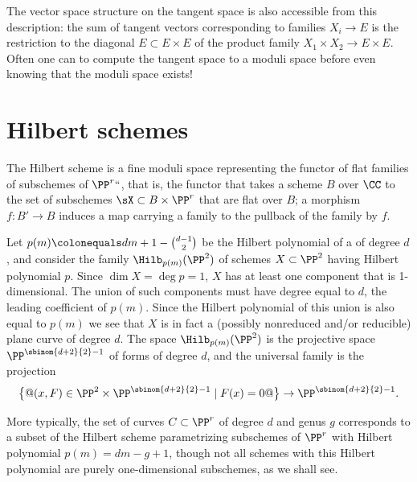 The vector space structure on the tangent space is also accessible from
this description:  the
 sum of tangent vectors corresponding to families $X_i \to E$ is the
 restriction to the diagonal
 $E \subset E\times E$
 of the product family $X_1 \times X_2 \to E\times E$.
Often one can to compute the tangent space to a moduli space before even
knowing that the moduli space exists!

\section{Hilbert schemes}
\label{hilbert scheme section}

The Hilbert scheme is a fine moduli space representing the functor of
%
%
%
flat families of subschemes of $\PP^r` `$,
that is, the functor that takes a scheme $B$ over $\CC$ to the set of
subschemes $\sX \subset B\times \PP^r$
that are flat over $B$; a morphism $f: B'\to B$ induces a map carrying
a family to the pullback of the family by $f$.

\begin{example}
\label{Hilb for plane curves}
Let $p(m) \colonequals  dm+1-\tbinom{d-1}{ 2}$ be the Hilbert polynomial of
a
%
of degree $d$, and consider the family
$\Hilb_{p(m)}(\PP^2)$
%
of schemes $X \subset \PP^{2}$ having Hilbert polynomial $p$. Since
$\dim X = \deg p = 1$, $X$ has at least one component that is
1-dimensional. The union of such components must have degree
equal to $d$, the leading coefficient of $p(m)$. Since the Hilbert
polynomial  of this union is also equal
to $p(m)$ we see that $X$ is in fact a (possibly nonreduced and/or
reducible) plane curve of degree $d$. The space $\Hilb_{p(m)}(\PP^2)$
is the projective space $\PP^{\sbinom{d+2}{2}-1}$ of forms of degree $d$,
and the universal family is the projection
%
$$
\bigl\{@(x,F) \in \PP^2 \times \PP^{\sbinom{d+2}{2}-1} \mid F(x)=0@\bigr\} \to
\PP^{\sbinom{d+2}{2}-1}.
$$

More typically, the set of curves $C \subset \PP^r$ of degree $d$ and
genus $g$ corresponds to a subset of the Hilbert scheme parametrizing
subschemes of $\PP^r$ with Hilbert polynomial $p(m) = dm - g + 1$, though
not all schemes with this Hilbert polynomial are purely one-dimensional
subschemes, as we shall see.
\end{example}

